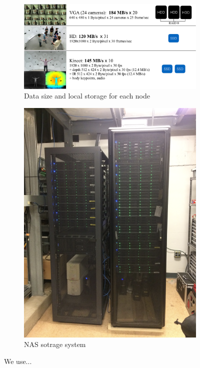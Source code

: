 \begin{figure}[t]	
\centering
\begin{subfigure}{0.71\textwidth}
	\includegraphics[width=\textwidth]{fig_system/storage}
	\caption{Data size and local storage for each node}
\end{subfigure}
\begin{subfigure}{0.27\textwidth}
\includegraphics[width=\textwidth]{fig_system/dome_NAS}
\caption{NAS sotrage system}
\end{subfigure}
\caption{We use...}
\end{figure}



